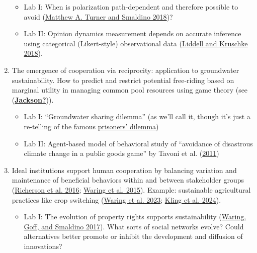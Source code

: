 \documentclass[
]{article}
\providecommand{\tightlist}{%
  \setlength{\itemsep}{0pt}\setlength{\parskip}{0pt}}
\begin{document}
\begin{enumerate}
  \begin{itemize}
  \tightlist
  \item
    Lab I: When is polarization path-dependent and therefore possible to
    avoid {(\hyperref[ref-Turner2018]{Matthew A. Turner and Smaldino
    2018})}?
  \item
    Lab II: Opinion dynamics measurement depends on accurate inference
    using categorical (Likert-style) observational data
    {(\hyperref[ref-Liddell2018]{Liddell and Kruschke 2018})}.
  \end{itemize}
\item
  The emergence of cooperation via reciprocity: application to
  groundwater sustainability. How to predict and restrict potential
  free-riding based on marginal utility in managing common pool
  resources using game theory (see
  {(\hyperref[ref-Jackson]{\textbf{Jackson?}})}).

  \begin{itemize}
  \tightlist
  \item
    Lab I: ``Groundwater sharing dilemma'' (as we'll call it, though
    it's just a re-telling of the famous
    \href{https://en.wikipedia.org/wiki/Prisoner\%27s_dilemma}{prisoners'
    dilemma})
  \item
    Lab II: Agent-based model of behavioral study of ``avoidance of
    disastrous climate change in a public goods game'' by {Tavoni et al.
    (\hyperref[ref-Tavoni2011]{2011})}
  \end{itemize}
\item
  Ideal institutions support human cooperation by balancing variation
  and maintenance of beneficial behaviors within and between stakeholder
  groups {(\hyperref[ref-Richerson2016d]{Richerson et al. 2016};
  \hyperref[ref-Waring2015]{Waring et al. 2015})}. Example: sustainable
  agricultural practices like crop switching
  {(\hyperref[ref-Waring2023]{Waring et al. 2023};
  \hyperref[ref-Kling2024]{Kling et al. 2024})}.

  \begin{itemize}
  \tightlist
  \item
    Lab I: The evolution of property rights supports sustainability
    {(\hyperref[ref-Waring2017]{Waring, Goff, and Smaldino 2017})}. What
    sorts of social networks evolve? Could alternatives better promote
    or inhibit the development and diffusion of innovations?
  \end{itemize}
\end{enumerate}

\label{quarto-appendix}
\label{quarto-bibliography}
\end{document}
